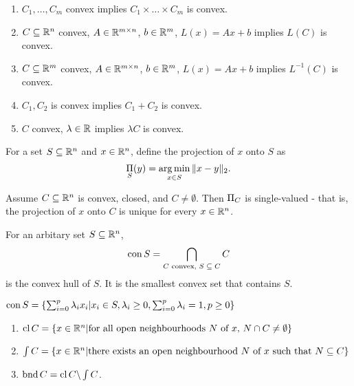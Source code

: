 \begin{thm}
  \label{sec:convexity-11}
  \begin{enumerate}
  \item $C_{1}, \dots, C_{m}$ convex implies $C_{1} \times \dots
    \times C_{m}$ is convex.
  \item $C \subseteq \mathbb{R}^{n}$ convex, $A \in \mathbb{R}^{m \times n}$, $b \in
    \mathbb{R}^{m}$, $L(x) = Ax + b$ implies $L(C)$ is convex.
  \item $C \subseteq \mathbb{R}^{m}$ convex, $A \in \mathbb{R}^{m \times n}$, $b \in
    \mathbb{R}^{m}$, $L(x) = Ax + b$ implies $L^{-1}(C)$ is convex.
  \item $C_{1}, C_{2}$ is convex implies $C_{1} + C_{2}$ is convex.
  \item $C$ convex, $\lambda \in \mathbb{R}$ implies $\lambda C$ is convex.
  \end{enumerate}
\end{thm}

\begin{defn}
  \label{sec:convexity-12}
  For a set $S \subseteq \mathbb{R}^{n}$ and $x \in \mathbb{R}^{n}$, define the
  projection of $x$ onto $S$ as
  \begin{equation}
    \label{eq:9}
    \operatorname*{\Pi}_{S}(y) = \operatorname*{arg\,min}_{x \in S} \|x - y\|_{2}.
  \end{equation}
\end{defn}

\begin{thm}
  \label{sec:convexity-13}
  Assume $C \subseteq \mathbb{R}^{n}$ is convex, closed, and $C \neq
  \emptyset$.  Then $\operatorname*{\Pi}_{C}$ is single-valued - that is, the
  projection of $x$ onto $C$ is unique for every $x \in \mathbb{R}^{n}$.
\end{thm}

\begin{defn}
  \label{sec:convexity-14}
  For an arbitary set $S \subseteq \mathbb{R}^{n}$,
  \begin{equation}
    \label{eq:10}
    \operatorname*{con} S = \bigcap_{\text{$C$ convex, $S \subseteq C$}} C
  \end{equation}
  is the convex hull of $S$.  It is the smallest convex set that
  contains $S$.
\end{defn}

\begin{thm}
  \label{sec:convexity-15}
  $\operatorname*{con} S = \{ \sum_{i=0}^{p} \lambda_{i} x_{i} | x_{i} \in S,
  \lambda_{i} \geq 0, \sum_{i=0}^{p} \lambda_{i} = 1, p \geq 0  \}$
\end{thm}


\begin{thm}
  \label{sec:convexity-16}
  \begin{enumerate}
  \item $\operatorname*{cl} C = \{ x \in \mathbb{R}^{n} | \text{for all open neighbourhoods
      $N$ of $x$, $N \cap C \neq \emptyset$} \}$
  \item $\int C = \{ x \in \mathbb{R}^{n} | \text{there exists an open
      neighbourhood $N$ of $x$ such that $N \subseteq C$} \} $
  \item $\operatorname*{bnd} C = \operatorname*{cl} C \backslash \int C$.
  \end{enumerate}
\end{thm}

